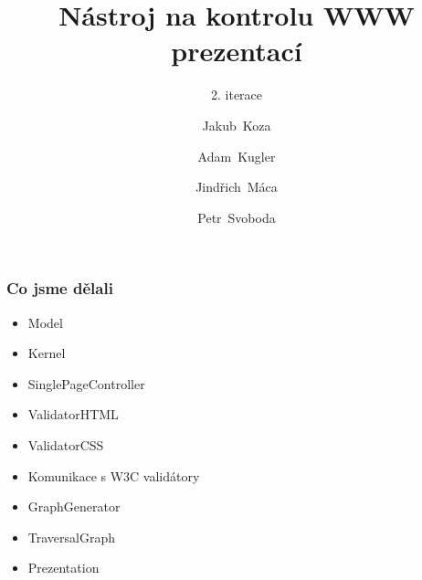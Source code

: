 \documentclass{beamer}
\begin{document}
\title [NKWP]{Nástroj na kontrolu WWW prezentací}
\author[J.~ Koza, A.~ Kugler, J.~Máca, P.~Svoboda]{Jakub~Koza \and Adam~Kugler \and Jindřich~Máca \and Petr~Svoboda}

\subtitle{2. iterace}
\frame{\titlepage}
\begin{frame}[allowframebreaks]\frametitle{Co jsme dělali}
   \begin{itemize}
    \item Model
		\item Kernel
		\item SinglePageController
		\item ValidatorHTML
		\item ValidatorCSS
		\item Komunikace s W3C validátory
		\item GraphGenerator
		\item TraversalGraph
		\item Prezentation
   \end{itemize}
\end{frame}
\end{document}
